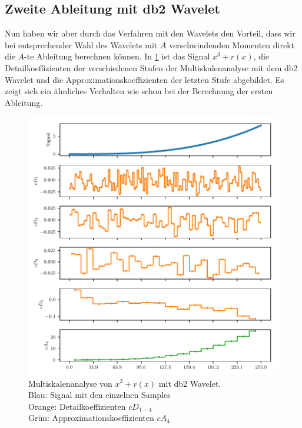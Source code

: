 \begin{refsection}
\subsection{Zweite Ableitung mit db2 Wavelet}

Nun haben wir aber durch das Verfahren mit den Wavelets den Vorteil, dass wir
bei entsprechender Wahl des Wavelets mit $A$ verschwindenden Momenten direkt
die $A$-te Ableitung berechnen können.
In \cref{polynomials:noise:db2_multi} ist das Signal $x^3 + r(x)$, die
Detailkoeffizienten der verschiedenen Stufen der Multiskalenanalyse mit dem db2
Wavelet und die Approximationskoeffizienten der letzten Stufe abgebildet.
Es zeigt sich ein ähnliches Verhalten wie schon bei der Berechnung der ersten
Ableitung.

\begin{figure}
    \centering
    \includegraphics{papers/polynomials/images/polynomials_noise_db2_multi.pdf}
    \caption{Multiskalenanalyse von $x^3 + r(x)$ mit db2 Wavelet. \\
             Blau: Signal mit den einzelnen Samples\\
             Orange: Detailkoeffizienten $cD_{1-4}$ \\
             Grün: Approximationskoeffizienten $cA_4$\label{polynomials:noise:db2_multi}}
\end{figure}

\end{refsection}
